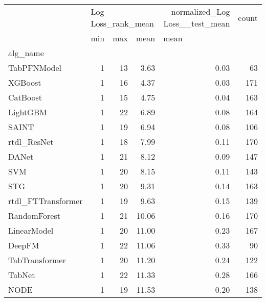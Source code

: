 \begin{tabular}{lrrrrr}
\toprule
{} & \multicolumn{3}{l}{Log Loss_rank_mean} & normalized_Log Loss__test_mean & count \\
{} &                min & max &   mean & \multicolumn{2}{l}{mean} \\
alg_name           &                    &     &        &                                &       \\
\midrule
TabPFNModel        &                  1 &  13 &   3.63 &                           0.03 &    63 \\
XGBoost            &                  1 &  16 &   4.37 &                           0.03 &   171 \\
CatBoost           &                  1 &  15 &   4.75 &                           0.04 &   163 \\
LightGBM           &                  1 &  22 &   6.89 &                           0.08 &   164 \\
SAINT              &                  1 &  19 &   6.94 &                           0.08 &   106 \\
rtdl_ResNet        &                  1 &  18 &   7.99 &                           0.11 &   170 \\
DANet              &                  1 &  21 &   8.12 &                           0.09 &   147 \\
SVM                &                  1 &  20 &   8.15 &                           0.11 &   143 \\
STG                &                  1 &  20 &   9.31 &                           0.14 &   163 \\
rtdl_FTTransformer &                  1 &  19 &   9.63 &                           0.15 &   139 \\
RandomForest       &                  1 &  21 &  10.06 &                           0.16 &   170 \\
LinearModel        &                  1 &  20 &  11.00 &                           0.23 &   167 \\
DeepFM             &                  1 &  22 &  11.06 &                           0.33 &    90 \\
TabTransformer     &                  1 &  20 &  11.20 &                           0.24 &   122 \\
TabNet             &                  1 &  22 &  11.33 &                           0.28 &   166 \\
NODE               &                  1 &  19 &  11.53 &                           0.20 &   138 \\

\end{tabular}
